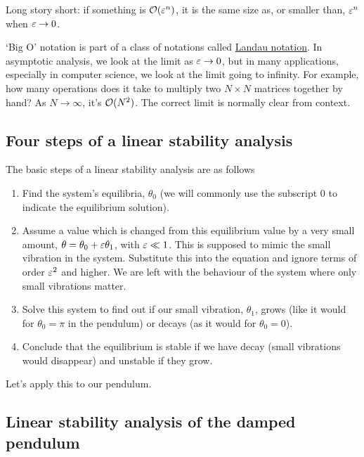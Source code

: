 \documentclass[main.tex]{subfiles}
\begin{document}
Long story short: if something is $\mathcal{O}(\varepsilon^n)$, it is the same size as, or smaller than, $\varepsilon^n$ when $\varepsilon \to 0$. 

\begin{nem}
	`Big O' notation is part of a class of notations called \href{https://en.wikipedia.org/wiki/Big_O_notation}{Landau notation}. In asymptotic analysis, we look at the limit as $\varepsilon \to 0$, but in many applications, especially in computer science, we look at the limit going to infinity. For example, how many operations does it take to multiply two $N\times N$ matrices together by hand? As $N \to \infty$, it's $\mathcal{O}(N^2)$. The correct limit is normally clear from context.
\end{nem}


\subsection{Four steps of a linear stability analysis}
The basic steps of a linear stability analysis are as follows
\begin{enumerate}[label=(\roman*)]
\item[\StepOneIcon] Find the system's equilibria, $\theta_0$ (we will commonly use the subscript $0$ to indicate the equilibrium solution). 
\item[\StepTwoIcon] Assume a value which is changed from this equilibrium value by a very small amount, $\theta = \theta_0 +\varepsilon \theta_1$, with $\varepsilon\ll 1$. This is supposed to mimic the small vibration in the system. Substitute this into the equation and 
ignore terms of order $\varepsilon^2$ and higher.
We are left with the behaviour of the system where only small vibrations matter.
\item[\StepThreeIcon] Solve this system to find out if our small vibration, $\theta_1$, grows (like it would for $\theta_0=\pi$ in the pendulum) or decays (as it would for $\theta_0=0$).
\item[\StepFourIcon] Conclude that the equilibrium is stable if we have decay (small vibrations would disappear) and unstable if they grow.
\end{enumerate} 

Let's apply this to our pendulum.

\subsection{Linear stability analysis of the damped pendulum}
\end{document}

